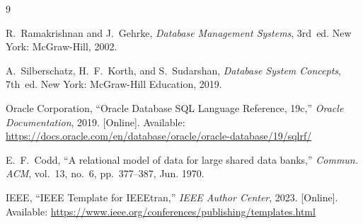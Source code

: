 \documentclass[conference]{IEEEtran}
\begin{document}
\begin{thebibliography}{9}

R.~Ramakrishnan and J.~Gehrke,
\textit{Database Management Systems}, 3rd~ed.
New York: McGraw-Hill, 2002.

A.~Silberschatz, H.~F.~Korth, and S.~Sudarshan,
\textit{Database System Concepts}, 7th~ed.
New York: McGraw-Hill Education, 2019.

Oracle Corporation,
``Oracle Database SQL Language Reference, 19c,''
\textit{Oracle Documentation},
2019. [Online]. Available: \url{https://docs.oracle.com/en/database/oracle/oracle-database/19/sqlrf/}

E.~F.~Codd,
``A relational model of data for large shared data banks,''
\textit{Commun. ACM}, vol.~13, no.~6, pp.~377--387, Jun. 1970.

IEEE,
``IEEE Template for IEEEtran,''
\textit{IEEE Author Center},
2023. [Online]. Available: \url{https://www.ieee.org/conferences/publishing/templates.html}

\end{thebibliography}
\end{document}
